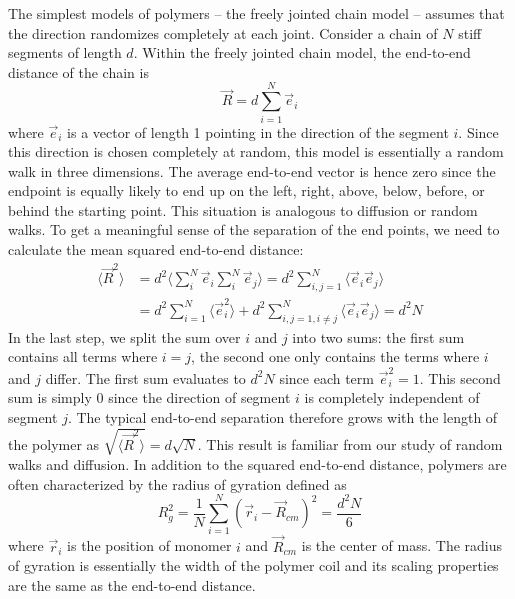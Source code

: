The simplest models of polymers -- the freely jointed chain model -- assumes that the direction randomizes completely at each joint.
Consider a chain of $N$ stiff segments of length $d$.
Within the freely jointed chain model, the end-to-end distance of the chain is
\begin{equation}
	\vec{R} = d \sum_{i=1}^N \vec{e}_i
\end{equation}
where $\vec{e}_i$ is a vector of length 1 pointing in the direction of the segment $i$.
Since this direction is chosen completely at random, this model is essentially a random walk in three dimensions.
The average end-to-end vector is hence zero since the endpoint is equally likely to end up on the left, right, above, below, before, or behind the starting point.
This situation is analogous to diffusion or random walks.
To get a meaningful sense of the separation of the end points, we need to calculate the mean squared end-to-end distance:
\begin{equation}
\begin{split}
\label{eq:FJC}
	\langle \vec{R}^2 \rangle &= d^2\langle\sum_{i}^N \vec{e}_i\sum_{i}^N \vec{e}_j\rangle = d^2\sum_{i,j=1}^N \langle\vec{e}_i\vec{e}_j\rangle \\
	& = d^2\sum_{i=1}^N \langle \vec{e}_i^2 \rangle + d^2\sum_{i,j=1, i\neq j}^N \langle \vec{e}_i\vec{e}_j \rangle = d^2N
\end{split}
\end{equation}
In the last step, we split the sum over $i$ and $j$ into two sums: the first sum contains all terms where $i=j$, the second one only contains the terms where $i$ and $j$ differ.
The first sum evaluates to $d^2N$ since each term $\vec{e}_i^2=1$.
This second sum is simply 0 since the direction of segment $i$ is completely independent of segment $j$.
The typical end-to-end separation therefore grows with the length of the polymer as $\sqrt{\langle \vec{R}^2 \rangle} = d\sqrt{N}$.
This result is familiar from our study of random walks and diffusion.
In addition to the squared end-to-end distance, polymers are often characterized by the radius of gyration defined as
\begin{equation}
	R_g^2 = \frac{1}{N}\sum_{i=1}^N (\vec{r}_i - \vec{R}_{cm})^2 = \frac{d^2N}{6}
\end{equation}
where $\vec{r}_i$ is the position of monomer $i$ and $\vec{R}_{cm}$ is the center of mass.
The radius of gyration is essentially the width of the polymer coil and its scaling properties are the same as the end-to-end distance.


